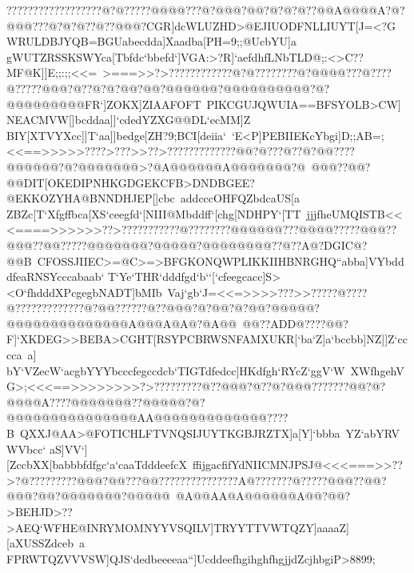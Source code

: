 {{{ ??????????????????@?@?????@@@@???@?@@@?@@?@?@?@??@@A@@@@A?@?@@@???@?@?@??@??@@@?CGR]dcWLUZHD>@EJIUODFNLLIUYT[J=<?G%
 WRULDBJYQB=BGUabecdda]Xaadba[PH=9;;@UcbYU]a}
 \hbox{gWUTZRSSKSWYca[Tbfdc`bbefd`]VGA:>?R]`aefdhfLNbTLD@;:<>C??MF@K]]E;;:;;<<=%
 >===>>?>????????????@?@????????@?@@@@???@????@?????@@@?@??@?@?@@?@@?@@@@@@?@@@@@@@@@@?@?@@@@@@@@@FR`]ZOKX]ZIAAFOFT%
 PIKCGUJQWUIA==BFSYOLB>CW]NEACMVW[]bcddaa]]`cdedYZXG@@DL`ecMM]Z}
 \hbox{BIY[XTVYXcc]]T`aa]]bedge[ZH?9;BCI[deiia`%
 `E<P]PEBIIEKcYbgi]D;;AB=;<<==>>>>>????>???>>??>?????????????@@?@???@??@?@@????@@@@@@?@?@@@@@@@>?@A@@@@@@A@@@@@@@?@%
 @@@??@@?@@DIT[OKEDIPNHKGDGEKCFB>DNDBGEE?@EKKOZYHA@BNNDHJEP[]cbc%
 addcccOHFQZbdcaUS[a}
 \hbox{ZBZc[T`Xfgffbca[XS`ceegfd`[NIII@Mbddff`[chg[NDHPY`[TT%
 jjjfheUMQISTB<<<====>>>>>>??>???????????@????????@@@@@@???@@@@?????@@@??@@@??@@?????@@@@@@@?@@@@@?@@@@@@@@??@??A@?DGIC@?@@B%
 CFOSSJIIEC>=@C>=>BFGKONQWPLIKKIIHBNRGHQ``abba]VYbdddfeaRNSYcccabaab`}
 \hbox{T`Ye`THR`dddfgd`b``[`cfeegcacc]S><O`fhdddXPcgegbNADT]bMIb%
 Vaj`gb`J=<<=>>>>???>>?????@????@?????????????@?@@??????@??@@@?@?@@?@?@@?@@@@@?@@@@@@@@@@@@@@A@@@A@A@?@A@@%
 @@??ADD@????@@?F]`XKDEG>>BEBA>CGHT[RSYPCBRWSNFAMXUKR[`ba`Z]a`bccbb]NZ]]Z`cccca%
 a]}
 \hbox{bY`VZecW`acgbYYYbcccfegccdcb`TIGTdfedcc]HKdfgh`RYcZ`ggV`W%
 XWfhgehVG>;<<<==>>>>>>>>?>?????????@??@@@?@??@?@@@???????@@?@?@@@@A????@@@@@@@??@@@@@?@?@@@@@@@@@@@@@@@AA@@@@@@@@@@@@@????B%
 QXXJ@AA>@FOTICHLFTVNQSIJUYTKGBJRZTX]a[Y]`bbba%
 YZ`abYRVWVbcc`}
 \hbox{aS]VV`][ZccbXX[babbbfdfgc`a`caaTdddeefcX%
 ffijgacfifYdNIICMNJPSJ@<<<===>>??>?@?????????@@@?@@???@@???????????????A@???????@?????@@@??@@?@@@?@@?@@@@@@@?@@@@@%
 @A@@AA@A@@@@@@A@@?@@?>BEHJD>??>AEQ`WFHE@INRYMOMNYYVSQILV]TRYYTTVWTQZY]aaaaZ][aXUSSZdceb%
 a}
 \hbox{FPRWTQZVVVSW]QJS`dedbeeeeaa``]UcddeefhgihghfhgjjdZcjhbgiP>8899;%
}}}
